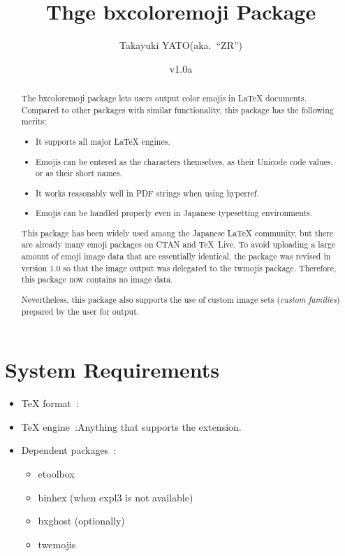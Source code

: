 \documentclass[a4paper]{article}
\newcommand{\PkgVersion}{1.0a}
\newcommand{\PkgDate}{2024/11/18}
\newcommand{\Pkg}[1]{\textsf{#1}}
\newcommand{\Means}{~:\quad}
\newcommand{\／}{\mbox{}／\mbox{}}
\begin{document}
\title{Thge \Pkg{bxcoloremoji} Package}
\author{Takayuki YATO\quad (aka.~``ZR'')}
\date{v\PkgVersion \quad[\PkgDate]}
\maketitle

\begin{abstract}

The \Pkg{bxcoloremoji} package lets users output color emojis
in {\LaTeX} documents.
Compared to other packages with similar functionality,
this package has the following merits:
\begin{itemize}
\item It supports all major {\LaTeX} engines.
\item Emojis can be entered as the characters themselves,
  as their Unicode code values, or as their short names.
\item It works reasonably well in PDF strings when using \Pkg{hyperref}.
\item Emojis can be handled properly even
  in Japanese typesetting environments.
\end{itemize}

This package has been widely used among the Japanese {\LaTeX} community,
but there are already many emoji packages on CTAN and {\TeX}~Live.
To avoid uploading a large amount of emoji image data
that are essentially identical,
the package was revised in version 1.0
so that the image output was delegated to the \Pkg{twmojis} package.
Therefore, this package now contains no image data.

Nevertheless, this package also supports
the use of custom image sets (\emph{custom families})
prepared by the user for output.
\end{abstract}

\tableofcontents


\section{System Requirements}
\label{sec:Prerequisites}

\begin{itemize}
\item {\TeX} format\Means {\LaTeX}
\item {\TeX} engine\Means Anything that supports the {\eTeX} extension.
\item Dependent packages\Means
  \begin{itemize}
  \item \Pkg{etoolbox}
  \item \Pkg{binhex} (when expl3 is not available)
  \item \Pkg{bxghost} (optionally)
  \item \Pkg{twemojis}
  \end{itemize}
\end{itemize}
\end{document}
